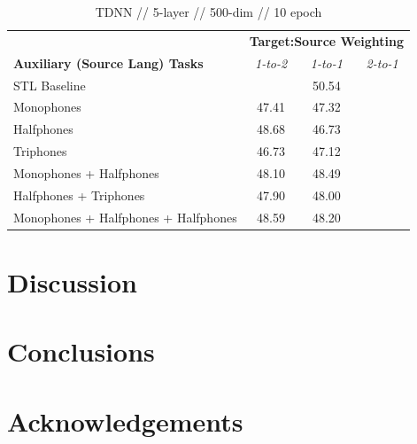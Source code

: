 \documentclass[a4paper]{article}
\begin{document}
\begin{table}[!htbp]
  \centering
    \caption{TDNN // 5-layer // 500-dim //  10 epoch }
  \begin{adjustbox}{width=.45\textwidth}
    \begin{tabular}{lccc}
      \toprule
      & \multicolumn{3}{c}{\textbf{Target:Source Weighting}} \\
      \textbf{Auxiliary (Source Lang) Tasks} & \textit{1-to-2} & \textit{1-to-1} & \textit{2-to-1}\\
      \midrule
      STL Baseline                          &  \multicolumn{3}{c}{50.54}  \\
      Monophones                            &  47.41  & 47.32 &  \\
      Halfphones                            &  48.68  & 46.73 & \\
      Triphones                             &  46.73  & 47.12 & \\
      Monophones + Halfphones               &  48.10  & 48.49 & \\
      Halfphones + Triphones                &  47.90  & 48.00 & \\
      Monophones + Halfphones + Halfphones  &  48.59  & 48.20 & \\
      \bottomrule
    \end{tabular}
    \label{table:data}
  \end{adjustbox}
\end{table}





\section{Discussion}


\section{Conclusions}

\section{Acknowledgements}





\end{document}
